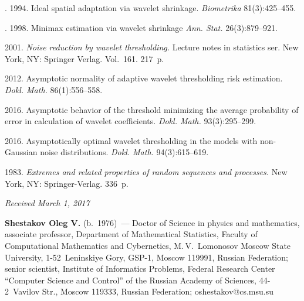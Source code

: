   \begin{multicols}{2}

\renewcommand{\bibname}{\protect\rmfamily References}

{\small\frenchspacing
 {%
 \begin{thebibliography}{9}



. 1994. Ideal spatial adaptation via wavelet 
shrinkage. \textit{Biometrika} 81(3):425--455.

. 1998. Minimax estimation via wavelet
 shrinkage \textit{Ann. Stat.}  26(3):879--921.

 2001. \textit{Noise reduction by wavelet thresholding.} 
Lecture notes in statistics ser.
New York, NY: Springer Verlag.  Vol.~161. 217~p.

 2012. Asymptotic normality of adaptive wavelet 
thresholding risk estimation. \textit{Dokl. Math.} 86(1):556--558.

 2016. 
Asymptotic behavior of the threshold minimizing the average probability of error 
in calculation of wavelet coefficients. \textit{Dokl. Math.} 93(3):295--299.

 2016. Asymptotically optimal 
wavelet thresholding in the models with non-Gaussian noise distributions. 
\textit{Dokl. Math.} 94(3):615--619.

 1983. 
\textit{Extremes and related properties of random sequences and processes.} 
New York, NY: Springer-Verlag. 336~p.
\end{thebibliography}

 }
 }

\end{multicols}

\vspace*{-3pt}

\hfill{\small\textit{Received March 1, 2017}}

\Contrl

\noindent
\textbf{Shestakov Oleg V.} (b.\ 1976)~--- 
Doctor of Science in physics and mathematics, associate professor, 
Department of Mathematical Statistics, Faculty of Computational Mathematics 
and Cybernetics, M.\,V.~Lomonosov Moscow State University, 1-52~Leninskiye Gory,
 GSP-1, Moscow 119991, Russian Federation; senior scientist, 
 Institute of Informatics Problems, Federal Research Center 
 ``Computer Science and Control'' of the Russian Academy of Sciences, 44-2~Vavilov Str., 
 Moscow 119333, Russian Federation; \mbox{oshestakov@cs.msu.su}
\label{end\stat}


\renewcommand{\bibname}{\protect\rm Литература} 